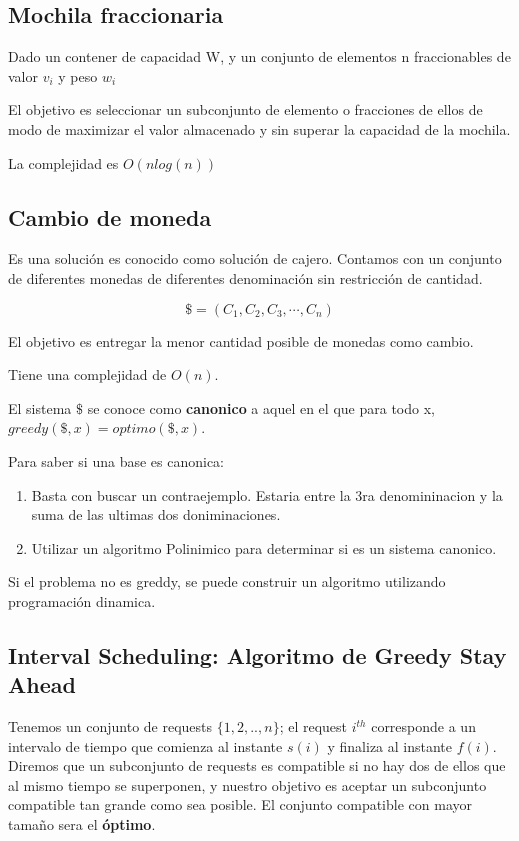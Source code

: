 \documentclass{article}
\begin{document}
\subsection{Mochila fraccionaria}

Dado un contener de capacidad W, y un conjunto de elementos n fraccionables de valor \(v_i\) y peso \(w_i\)

El objetivo es seleccionar un subconjunto de elemento o fracciones de ellos de modo de maximizar el valor almacenado y sin superar la capacidad de la mochila.

La complejidad es \(O(nlog(n))\)

\newpage
\subsection{Cambio de moneda}

Es una solución es conocido como solución de cajero. Contamos con un conjunto de diferentes monedas de diferentes denominación sin restricción de cantidad.

\[
    \$=(C_1,C_2,C_3,\cdots,C_n)  
\]

El objetivo es entregar la menor cantidad posible de monedas como cambio.

Tiene una complejidad de \(O(n)\).

El sistema \(\$\) se conoce como \textbf{canonico} a aquel en el que para todo x, \(greedy(\$,x)=optimo(\$,x)\).

Para saber si una base es canonica:
\begin{enumerate}
    \item Basta con buscar un contraejemplo. Estaria entre la 3ra denomininacion y la suma de las ultimas dos doniminaciones.
    \item Utilizar un algoritmo Polinimico para determinar si es un sistema canonico.
\end{enumerate}

Si el problema no es greddy, se puede construir un algoritmo utilizando programación dinamica.


\newpage
\subsection{Interval Scheduling: Algoritmo de Greedy Stay Ahead}

Tenemos un conjunto de requests \(\{1,2,..,n\}\); el request \(i^{th}\) corresponde a un intervalo de tiempo que comienza al instante \(s(i)\) y finaliza al instante \(f(i)\).
Diremos que un subconjunto de requests es compatible si no hay dos de ellos que al mismo tiempo se superponen, y nuestro objetivo es aceptar un subconjunto compatible tan grande como sea posible. El conjunto compatible con mayor tamaño sera el \textbf{óptimo}.
\end{document}
